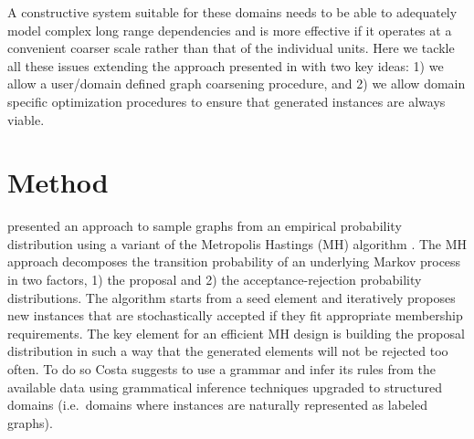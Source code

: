 \documentclass[a4paper]{esannV2}
\begin{document}
A constructive system suitable for these domains needs to be able to
adequately model complex long range dependencies and is more effective if it
operates at a convenient coarser scale rather than that of the individual
units. Here we tackle all these issues extending the approach presented in
\cite{costa16} with two key ideas: 1) we allow a user/domain defined graph
coarsening procedure, and 2) we allow domain specific optimization procedures
to ensure that generated instances are always viable.


\section{Method}

\cite{costa16} presented an approach to sample graphs from an empirical
probability distribution using a variant of the Metropolis Hastings (MH)
algorithm \citep{metropolis1953equation}. The MH approach decomposes the
transition probability of an underlying  Markov process in two factors, 1) the
proposal  and 2) the acceptance-rejection probability distributions. The
algorithm starts from a seed element and iteratively proposes new instances
that are stochastically accepted if they fit appropriate membership
requirements. The key element for an efficient MH design is building the
proposal distribution in such a way that the generated elements will not be
rejected too often. To do so Costa suggests to use a grammar and infer its
rules from the available data using grammatical inference techniques upgraded
to structured domains (i.e.\ domains where instances are naturally represented
as labeled graphs).
\end{document}
